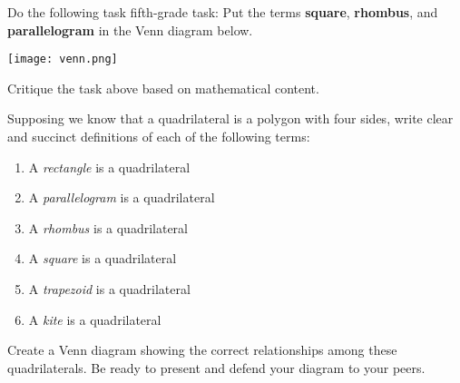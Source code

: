 \documentclass{ximera}
\begin{document}
\begin{problem}
Do the following task fifth-grade task: Put the
terms \textbf{square}, \textbf{rhombus}, and \textbf{parallelogram} in
the Venn diagram below.  
\begin{image}
\texttt{[image: venn.png]}
\end{image}
\end{problem}

\begin{problem} 
Critique the task above based on mathematical content.
\end{problem}

\newpage 
\begin{problem}
Supposing we know that a quadrilateral is a polygon with four sides, write clear and succinct definitions of each of the following terms: 
\begin{enumerate}
\itemsep18pt
\item A \textit{rectangle} is a quadrilateral 
\item A \textit{parallelogram} is a quadrilateral
\item A \textit{rhombus} is a quadrilateral
\item A \textit{square} is a quadrilateral
\item A \textit{trapezoid} is a quadrilateral
\item A \textit{kite} is a quadrilateral
\end{enumerate}
\end{problem}
\bigskip

\begin{problem} 
Create a Venn diagram showing the correct relationships
among these quadrilaterals. Be ready to present and defend your
diagram to your peers.
\end{problem}
\end{document}
